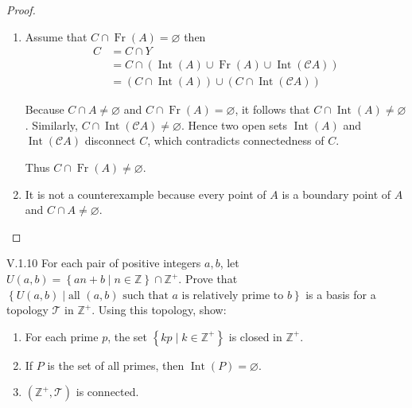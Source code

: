 \begin{proof}
	\begin{enumerate}[label={(\alph*)}]
		\item Assume that \( C \cap \operatorname{Fr}(A) = \varnothing \) then
		      \begingroup
		      \allowdisplaybreaks%
		      \begin{align*}
			      C & = C \cap Y                                                                                       \\
			        & = C \cap (\operatorname{Int}(A) \cup \operatorname{Fr}(A) \cup \operatorname{Int}(\mathscr{C}A)) \\
			        & = (C \cap \operatorname{Int}(A)) \cup (C \cap \operatorname{Int}(\mathscr{C}A))
		      \end{align*}
		      \endgroup

		      Because \( C \cap A \ne \varnothing \) and \( C \cap \operatorname{Fr}(A) = \varnothing \), it follows that \( C \cap \operatorname{Int}(A) \ne \varnothing \). Similarly, \( C \cap \operatorname{Int}(\mathscr{C}A) \ne \varnothing \). Hence two open sets \( \operatorname{Int}(A) \) and \( \operatorname{Int}(\mathscr{C}A) \) disconnect \( C \), which contradicts connectedness of \(C\).

		      Thus \( C \cap \operatorname{Fr}(A) \ne \varnothing \).
		\item It is not a counterexample because every point of \(A\) is a boundary point of \(A\) and \( C \cap A \ne \varnothing \).
	\end{enumerate}
\end{proof}

\begin{problem}{V.1.10}\label{problem:V.1.10}
For each pair of positive integers \( a, b \), let \( U(a, b) = \left\{ an + b \mid n \in \mathbb{Z} \right\} \cap \mathbb{Z}^{+} \). Prove that \( \left\{ U(a, b) \mid \text{all } (a, b) \text{ such that } a \text{ is relatively prime to } b \right\} \) is a basis for a topology \( \mathscr{T} \) in \( \mathbb{Z}^{+} \). Using this topology, show:
\begin{enumerate}[label={(\alph*)}]
	\item For each prime \(p\), the set \( \left\{ kp \mid k \in \mathbb{Z}^{+}  \right\} \) is closed in \( \mathbb{Z}^{+} \).
	\item If \(P\) is the set of all primes, then \( \operatorname{Int}(P) = \varnothing \).
	\item \( (\mathbb{Z}^{+}, \mathscr{T}) \) is connected.
\end{enumerate}
\end{problem}

